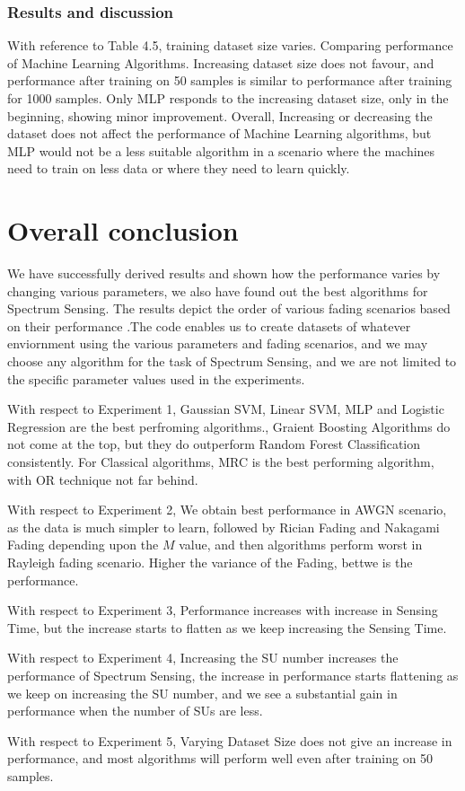 \subsubsection{Results and discussion}
With reference to Table 4.5, training dataset size varies. Comparing performance of Machine Learning Algorithms. Increasing dataset size does not favour, and performance after training on 50 samples is similar to performance after training for 1000 samples. Only MLP responds to the increasing dataset size, only in the beginning, showing minor improvement. Overall, Increasing or decreasing the dataset does not affect the performance of Machine Learning algorithms, but MLP would not be a less suitable algorithm in a scenario where the machines need to train on less data or where they need to learn quickly.

\section{Overall conclusion}
We have successfully derived results and shown how the performance varies by changing various parameters, we also have found out the best algorithms for Spectrum Sensing. The results depict the order of various fading scenarios based on their performance .The code enables us to create datasets of whatever enviornment using the various parameters and fading scenarios, and we may choose any algorithm for the task of Spectrum Sensing, and we are not limited to the specific parameter values used in the experiments.

With respect to Experiment 1, Gaussian SVM, Linear SVM, MLP and Logistic Regression are the best perfroming algorithms., Graient Boosting Algorithms do not come at the top, but they do outperform Random Forest Classification consistently. For Classical algorithms, MRC is the best performing algorithm, with OR technique not far behind.

With respect to Experiment 2, We obtain best performance in AWGN scenario, as the data is much simpler to learn, followed by Rician Fading and Nakagami Fading depending upon the $M$ value, and then algorithms perform worst in Rayleigh fading scenario. Higher the variance of the Fading, bettwe is the performance.  

With respect to Experiment 3, Performance increases with increase in Sensing Time, but the increase starts to flatten as we keep increasing the Sensing Time. 

With respect to Experiment 4, Increasing the SU number increases the performance of Spectrum Sensing, the increase in performance starts flattening as we keep on increasing the SU number, and we see a substantial gain in performance  when the number of SUs are less.

With respect to Experiment 5, Varying Dataset Size does not give an increase in performance, and most algorithms will perform well even after training on 50 samples.

